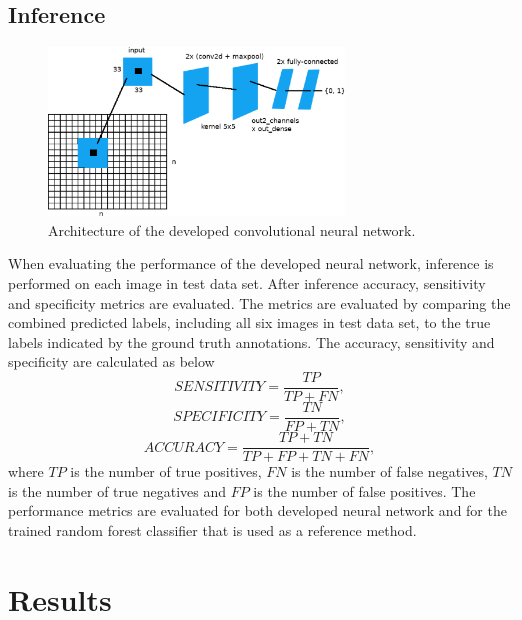 \documentclass[aps,prb,10pt,twocolumn,groupedaddress]{revtex4-1}
\begin{document}
\subsection{Inference}
\label{sec:computational_methods_inference}
\begin{figure}[!t]
	\centering
	\includegraphics[width=0.7\textwidth]{images/net_cropped.eps}
	\caption{Architecture of the developed convolutional neural network.}
	\label{fig:net}
\end{figure}
When evaluating the performance of the developed neural network, inference is performed on each image in test data set. After inference accuracy, sensitivity and specificity metrics are evaluated. The metrics are evaluated by comparing the combined predicted labels, including all six images in test data set, to the true labels indicated by the ground truth annotations. The accuracy, sensitivity and specificity are calculated as below  
\begin{equation}
	SENSITIVITY = \frac{TP}{TP + FN},
	\label{eq:sensitivity}
\end{equation}
\begin{equation}
	SPECIFICITY = \frac{TN}{FP + TN},
	\label{eq:specifity}
\end{equation}
\begin{equation}
	ACCURACY = \frac{TP + TN}{TP + FP + TN + FN},
	\label{eq:accuracy}
\end{equation}
where $TP$ is the number of true positives, $FN$ is the number of false negatives, $TN$ is the number of true negatives and $FP$ is the number of false positives.
The performance metrics are evaluated for both developed neural network and for the trained random forest classifier that is used as a reference method.


\section{Results}
\label{sec:results}
\end{document}
